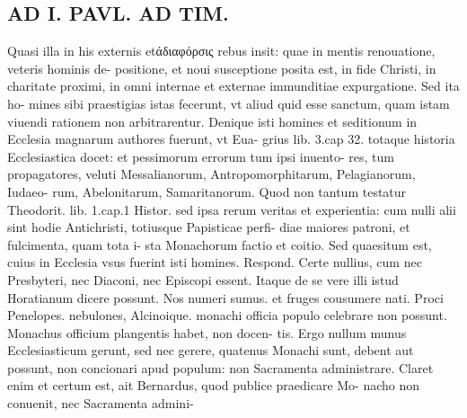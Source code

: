 \documentclass{article}
\begin{document}
\begin{pages}
\section*{AD I. PAVL. AD TIM. }
\marginpar{[ p.222 ]}\pstart Quasi illa in his externis etάδιαφόρσις rebus insit: quae in mentis renouatione, veteris hominis de- positione, et noui susceptione posita est, in fide Christi, in charitate proximi, in omni internae et externae immunditiae expurgatione. Sed ita ho- mines sibi praestigias istas fecerunt, vt aliud quid esse sanctum, quam istam viuendi rationem non arbitrarentur. Denique isti homines et seditionum in Ecclesia magnarum authores fuerunt, vt Eua- grius lib. 3.cap 32. totaque historia Ecclesiastica docet: et pessimorum errorum tum ipsi inuento- res, tum propagatores, veluti Messalianorum, Antropomorphitarum, Pelagianorum, Iudaeo- rum, Abelonitarum, Samaritanorum. Quod non tantum testatur Theodorit. lib.  1.cap.1 Histor. sed ipsa rerum veritas et experientia: cum nulli alii sint hodie Antichristi, totiusque Papisticae perfi- diae maiores patroni, et fulcimenta, quam tota i- sta Monachorum factio et coitio. Sed quaesitum est, cuius in Ecclesia vsus fuerint isti homines. Respond. Certe nullius, cum nec Presbyteri, nec Diaconi, nec Episcopi essent. Itaque de se vere illi istud Horatianum dicere possunt. Nos numeri sumus. et fruges cousumere nati. Proci Penelopes. nebulones, Alcinoique. monachi officia populo celebrare non possunt. Monachus officium plangentis habet, non docen- tis. Ergo nullum munus Ecclesiasticum gerunt, sed nec gerere, quatenus Monachi sunt, debent aut possunt, non concionari apud populum: non Sacramenta administrare. Claret enim et certum est, ait Bernardus, quod publice praedicare Mo- nacho non conuenit, nec Sacramenta admini-  \pend

\end{pages}
\end{document}
